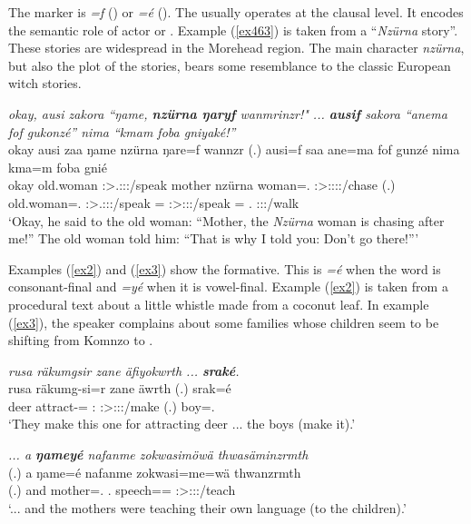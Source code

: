 The   marker is \emph{=f} (\Sg) or \emph{=é} (\Nsg). The  usually operates at the clausal level. It encodes the semantic role of actor or . Example (\ref{ex463}) is taken from a ``\emph{Nzürna} story''. These stories are widespread in the Morehead region. The main character \emph{nzürna}, but also the plot of the stories, bears some resemblance to the classic European witch stories.

\begin{exe}
	\ex \emph{okay, ausi zakora ``ŋame, \textbf{nzürna ŋaryf} wanmrinzr!" ... \textbf{ausif} sakora ``anema fof gukonzé'' nima ``kmam foba gniyaké!''}\\
	\gll okay ausi zaa ŋame nzürna ŋare=f wannzr (.) ausi=f saa ane=ma fof gunzé nima kma=m foba gnié\\
	okay {old.woman} \Stsg:\Sbj>\Tsg.\F:\Obj:\Pst:\Pfv/speak mother nzürna woman=\Erg.{\Sg} \Stsg:\Sbj>\Fsg:\Obj:\Nonpast:\Ipfv:\Venit/chase (.) {old.woman=\Erg.\Sg} \Stsg:\Sbj>\Tsg.\Masc:\Obj:\Pst:\Pfv/speak \Dem={\Char} {\Emph} \Fsg:\Sbj>\Ssg:\Obj:\Rpst:\Ipfv/speak {\Quot} \Pot={\Appr} \Dist.{\Abl} \Ssg:\Sbj:\Imp:\Ipfv/walk\\
	\trans `Okay, he said to the old woman: ``Mother, the \emph{Nzürna} woman is chasing after me!'' The old woman told him: ``That is why I told you: Don't go there!'''\\
	\label{ex463}
\end{exe} 

Examples (\ref{ex2}) and (\ref{ex3}) show the   formative. This is \emph{=é} when the word is consonant-final and \emph{=yé} when it is vowel-final. Example (\ref{ex2}) is taken from a procedural text about a little whistle made from a coconut leaf. In example (\ref{ex3}), the speaker complains about some families whose children seem to be shifting from Komnzo to . 

\begin{exe}
	\ex \emph{rusa räkumgsir zane äfiyokwrth ... \textbf{sraké}.}\\
	\gll rusa räkumg-si=r zane äwrth (.) srak=é\\
	deer attract-{\Nmlz}={\Purp} \Dem:{\Prox} \Stpl:\Sbj>\Stpl:\Obj:\Nonpast:\Ipfv/make (.) boy=\Erg.{\Nsg}\\
	\trans `They make this one for attracting deer ... the boys (make it).'
	\label{ex2}
\end{exe}
\begin{exe}
	\ex \emph{... a \textbf{ŋameyé} nafanme zokwasimöwä thwasäminzrmth}\\
	\gll (.) a ŋame=é nafanme zokwasi=me=wä thwanzrmth\\
	(.) and mother=\Erg.{\Nsg} \Tnsg{}.{\Poss} speech={\Ins}={\Emph} \Stpl:\Sbj>\Stpl:\Obj:\Pst:\Dur/teach\\
	\trans `... and the mothers were teaching their own language (to the children).'\\ 
	\label{ex3}
\end{exe}

